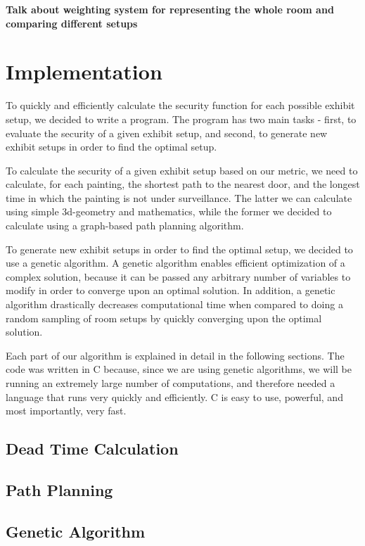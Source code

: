 \documentclass{article}
\begin{document}
	\textbf{Talk about weighting system for representing the whole room and comparing different setups}


	\section{Implementation}
	
	To quickly and efficiently calculate the security function for each possible exhibit setup, we decided to write a program. The program has two main tasks - first, to evaluate the security of a given exhibit setup, and second, to generate new exhibit setups in order to find the optimal setup. 
	
	To calculate the security of a given exhibit setup based on our metric, we need to calculate, for each painting, the shortest path to the nearest door, and the longest time in which the painting is not under surveillance. The latter we can calculate using simple 3d-geometry and mathematics, while the former we decided to calculate using a graph-based path planning algorithm.
	
	To generate new exhibit setups in order to find the optimal setup, we decided to use a genetic algorithm. A genetic algorithm enables efficient optimization of a complex solution, because it can be passed any arbitrary number of variables to modify in order to converge upon an optimal solution. In addition, a genetic algorithm drastically decreases computational time when compared to doing a random sampling of room setups by quickly converging upon the optimal solution. 
	
	Each part of our algorithm is explained in detail in the following sections. The code was written in C because, since we are using genetic algorithms, we will be running an extremely large number of computations, and therefore needed a language that runs very quickly and efficiently. C is easy to use, powerful, and most importantly, very fast. 

	\subsection{Dead Time Calculation}
	
	\subsection{Path Planning}
	
	\subsection{Genetic Algorithm}
	
\end{document}

